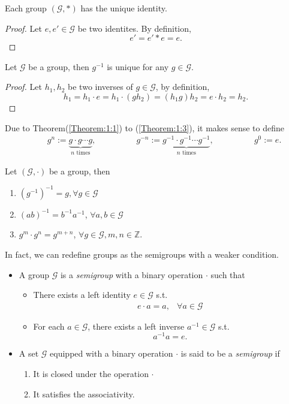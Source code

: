 \begin{theorem}\label{Theorem:1:2}
Each group $(\mathcal{G},*)$ has the unique identity.
\end{theorem}
\begin{proof}
Let $e,e'\in\mathcal{G}$ be two identites. By definition,
\[
e' = e'* e = e.
\]
\end{proof}
\begin{theorem}\label{Theorem:1:3}
Let $\mathcal{G}$ be a group, then $g^{-1}$ is unique for any $g\in\mathcal{G}$.
\end{theorem}
\begin{proof}
Let $h_1,h_2$ be two inverses of $g\in\mathcal{G}$, by definition,
\[
h_1 = h_1\cdot e = h_1\cdot (gh_2) = (h_1g)h_2 = e\cdot h_2 = h_2.
\]
\end{proof}
\begin{remark}
Due to Theorem(\ref{Theorem:1:1}) to (\ref{Theorem:1:3}), it makes sense to define
\[
\begin{array}{lll}
\qquad g^n:=\underbrace{g\cdot g\cdots g}_{\text{$n$ times}},
\qquad
&
\qquad g^{-n}:=\underbrace{g^{-1}\cdot g^{-1}\cdots g^{-1}}_{\text{$n$ times}},
\qquad
&
\qquad g^0:=e.
\end{array}
\]
\end{remark}


\begin{proposition}
Let $(\mathcal{G},\cdot)$ be a group, then
\begin{enumerate}
\item
$(g^{-1})^{-1}=g, \forall g\in\mathcal{G}$
\item
$(ab)^{-1}=b^{-1}a^{-1}$, $\forall a,b\in\mathcal{G}$
\item
$g^m\cdot g^n = g^{m+n}$, $\forall g\in\mathcal{G}, m,n\in\mathbb{Z}$.
\end{enumerate}
\end{proposition}
In fact, we can redefine groups as the semigroups with a weaker condition.
\begin{definition}[Group]\label{Def:1:3}
\begin{itemize}
\item
A group $\mathcal{G}$ is a \emph{semigroup} with a binary operation $\cdot$ such that
\begin{itemize}
\item
There exists a left identity $e\in\mathcal{G}$ s.t.
\[
\begin{array}{ll}
e\cdot a=a,
&
\forall a\in\mathcal{G}
\end{array}
\]
\item
For each $a\in\mathcal{G}$, there exists a left inverse $a^{-1}\in\mathcal{G}$ s.t.
\[
a^{-1}a = e.
\]
\end{itemize}
\item
A set $\mathcal{G}$ equipped with a binary operation $\cdot$ is said to be a \emph{semigroup} if
\begin{enumerate}
\item
It is closed under the operation $\cdot$
\item
It satisfies the associativity.
\end{enumerate}
\end{itemize}
\end{definition}

